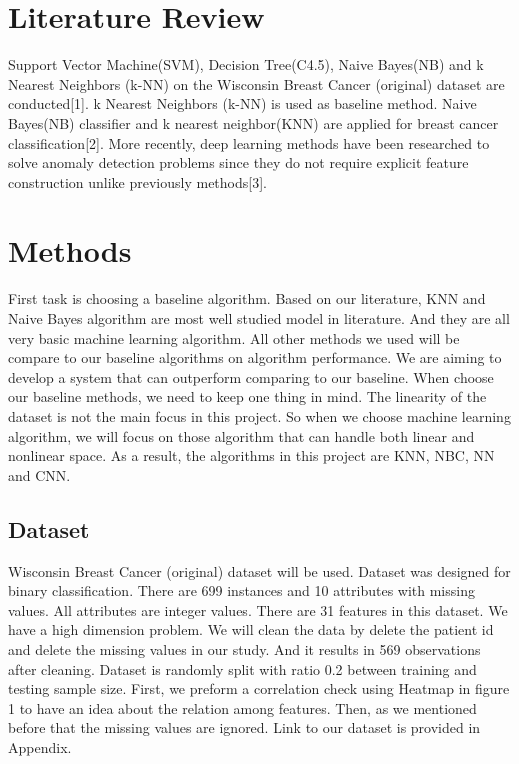 \documentclass{article} %
\begin{document}
\section{Literature Review}
\label{gen_inst}
Support Vector Machine(SVM), Decision Tree(C4.5), Naive Bayes(NB) and k Nearest Neighbors (k-NN) on the Wisconsin Breast Cancer (original) dataset are conducted[1]. k Nearest Neighbors (k-NN) is used as baseline method. Naive Bayes(NB) classifier and k nearest neighbor(KNN) are applied for breast cancer classification[2]. More recently, deep learning methods have been researched to solve anomaly detection problems since they do not require explicit feature construction unlike previously methods[3].


\section{Methods}
\label{headings}

First task is choosing a baseline algorithm. Based on our literature, KNN and Naive Bayes algorithm are most well studied model in literature. And they are all very basic machine learning algorithm. All other methods we used will be compare to our baseline algorithms on algorithm performance. We are aiming to develop a system that can outperform comparing to our baseline. When choose our baseline methods, we need to keep one thing in mind. The linearity of the dataset is not the main focus in this project. So when we choose machine learning algorithm, we will focus on those algorithm that can handle both linear and nonlinear space. As a result, the algorithms in this project are KNN, NBC, NN and CNN.

\subsection{Dataset}
Wisconsin Breast Cancer (original) dataset will be used. Dataset was designed for binary classification. There are 699 instances and 10 attributes with missing values. All attributes are integer values. There are 31 features in this dataset. We have a high dimension problem. We will clean the data by delete the patient id and delete the missing values in our study. And it results in 569 observations after cleaning. Dataset is randomly split with ratio 0.2 between training and testing sample size. First, we preform a correlation check using Heatmap in figure 1 to have an idea about the relation among features. Then, as we mentioned before that the missing values are ignored. Link to our dataset is provided in Appendix. 
\end{document}
